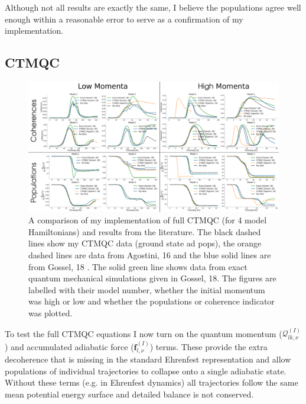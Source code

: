 \\\\
Although not all results are exactly the same, I believe the populations agree well enough within a reasonable error to serve as a confirmation of my implementation.
\subsection{CTMQC}
\begin{figure}[h]
	\includegraphics[width=\textwidth]{img/CTMQC/TullyModels/CTMQC_LitComp.png}
	\caption{\label{fig:LitCompCTMQCTully}A comparison of my implementation of full CTMQC (for 4 model Hamiltonians) and results from the literature. The black dashed lines show my CTMQC data (ground state ad pops), the orange dashed lines are data from Agostini, 16 \cite{agostini_quantum-classical_2016} and the blue solid lines are from Gossel, 18 \cite{gossel_coupled-trajectory_2018}. The solid green line shows data from exact quantum mechanical simulations given in Gossel, 18. The figures are labelled with their model number, whether the initial momentum was high or low and whether the populations or coherence indicator was plotted.}
\end{figure}
To test the full CTMQC equations I now turn on the quantum momentum ($\mathcal{Q}_{lk, \nu}^{(I)}$) and accumulated adiabatic force ($\mathbf{f}_{l, \nu}^{(I)}$) terms. These provide the extra decoherence that is missing in the standard Ehrenfest representation and allow populations of individual trajectories to collapse onto a single adiabatic state. Without these terms (e.g. in Ehrenfest dynamics) all trajectories follow the same mean potential energy surface and detailed balance is not conserved.
\\\\
